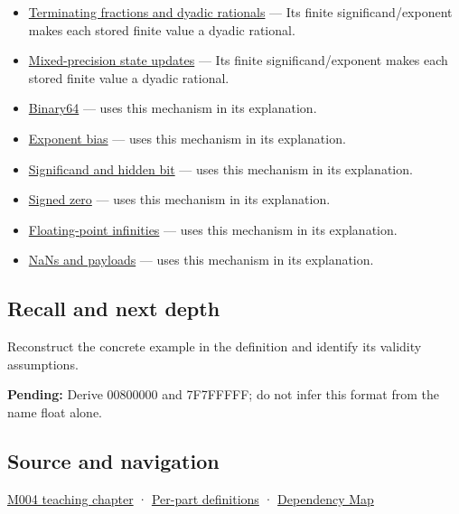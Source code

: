 \begin{itemize}
\item
  \hyperref[appendix-2a2f1b74bdd3]{Terminating fractions and dyadic rationals} --- Its finite significand/exponent makes each stored finite value a dyadic rational.
\item
  \hyperref[appendix-260182e617b7]{Mixed-precision state updates} --- Its finite significand/exponent makes each stored finite value a dyadic rational.
\item
  \hyperref[appendix-5078dfab64e6]{Binary64} --- uses this mechanism in its explanation.
\item
  \hyperref[appendix-2fae058c82e1]{Exponent bias} --- uses this mechanism in its explanation.
\item
  \hyperref[appendix-a24fd710cf67]{Significand and hidden bit} --- uses this mechanism in its explanation.
\item
  \hyperref[appendix-3a048f032c1f]{Signed zero} --- uses this mechanism in its explanation.
\item
  \hyperref[appendix-eb336149c00a]{Floating-point infinities} --- uses this mechanism in its explanation.
\item
  \hyperref[appendix-d6607cc4c235]{NaNs and payloads} --- uses this mechanism in its explanation.
\end{itemize}

\subsection{Recall and next depth}\label{appendix-5057f9ad327f-recall-and-next-depth}

Reconstruct the concrete example in the definition and identify its validity assumptions.

\textbf{Pending:} Derive 00800000 and 7F7FFFFF; do not infer this format from the name float alone.

\subsection{Source and navigation}\label{appendix-5057f9ad327f-source-and-navigation}

\hyperref[01-foundations-i-ch001-a-stretching-ruler-for-real-valued-quantities]{M004 teaching chapter} · \hyperref[appendix-fd090d982a15-m004---parts-61-76]{Per-part definitions} · \hyperref[appendix-4ad47bdd269a]{Dependency Map}
